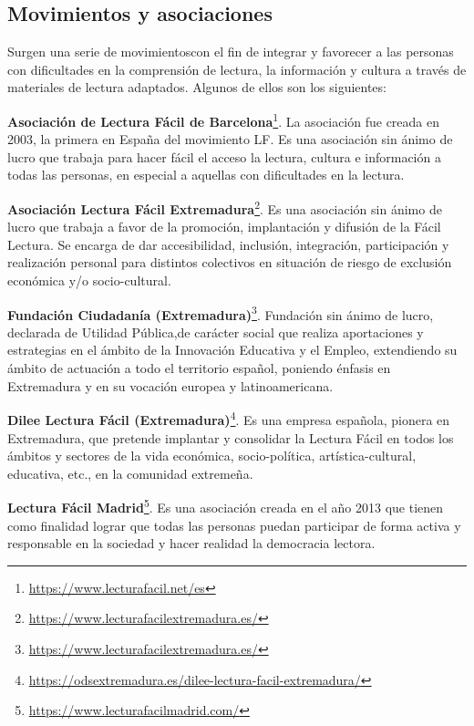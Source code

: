 \subsection{Movimientos y asociaciones}
Surgen una serie de movimientoscon el fin de integrar y favorecer a las personas con dificultades en la comprensión de lectura, la información y cultura a través de materiales de lectura adaptados. Algunos de ellos son los siguientes:
\begin{itemize}
	\item{\textbf{Asociación de Lectura Fácil de Barcelona}\footnote{\href{https://www.lecturafacil.net/es}{{https://www.lecturafacil.net/es}}}. La asociación fue creada en 2003, la primera en España del movimiento LF. Es una asociación sin ánimo de lucro que trabaja para hacer fácil el acceso la lectura, cultura e información a todas las personas, en especial a aquellas con dificultades en la lectura. 
	
	\item{\textbf{Asociación Lectura Fácil Extremadura}\footnote{\href{https://www.lecturafacilextremadura.es/}{{https://www.lecturafacilextremadura.es/}}}. Es una asociación sin ánimo de lucro que trabaja a favor de la promoción, implantación y difusión de la Fácil Lectura. Se encarga de  dar accesibilidad, inclusión, integración, participación y realización personal para distintos colectivos en situación de riesgo de exclusión económica y/o socio-cultural.
	
	\item{\textbf{Fundación Ciudadanía (Extremadura)}\footnote{\href{https://www.lecturafacilextremadura.es/}{https://www.lecturafacilextremadura.es/}}}. Fundación sin ánimo de lucro, declarada de Utilidad Pública,de carácter social que realiza aportaciones y estrategias en el ámbito de la Innovación Educativa y el Empleo, extendiendo su ámbito de actuación a todo el territorio español, poniendo énfasis en Extremadura y en su vocación europea y latinoamericana.
	
	\item{\textbf{Dilee Lectura Fácil (Extremadura)}\footnote{\href{https://odsextremadura.es/dilee-lectura-facil-extremadura/}{https://odsextremadura.es/dilee-lectura-facil-extremadura/}}}. Es una empresa española, pionera en Extremadura, que pretende implantar y consolidar la Lectura Fácil en todos los ámbitos y sectores de la vida económica, socio-política, artística-cultural, educativa, etc., en la comunidad extremeña.
	
	\item{\textbf{Lectura Fácil Madrid}\footnote{\href{https://www.lecturafacilmadrid.com/}{https://www.lecturafacilmadrid.com/}}}. Es una asociación creada en el año 2013 que tienen como finalidad  lograr que todas las personas puedan participar de forma activa y responsable en la sociedad y hacer realidad la democracia lectora. 
	
}}
\end{itemize}
